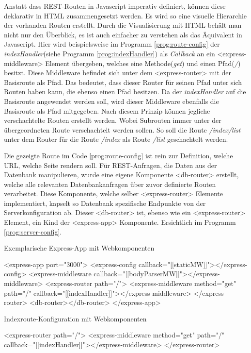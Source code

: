 Anstatt dass REST-Routen in Javascript imperativ definiert, können diese deklarativ in HTML zusammengesetzt werden. Es wird so eine visuelle Hierarchie der vorhanden Routen erstellt. Durch die Visualisierung mit HTML behält man nicht nur den Überblick, es ist auch einfacher zu verstehen als das Äquivalent in Javascript. Hier wird beispielsweise im Programm \ref{prog:route-config} der \textit{indexHandler}(siehe Programm \ref{prog:indexHandler}) als \textit{Callback} an ein <express-middleware> Element übergeben, welches eine Methode(\textit{get}) und einen Pfad(\textit{/})  besitzt. Diese Middleware befindet sich unter dem <express-router> mit der Basisroute als Pfad. Das bedeutet, dass dieser Router für seinen Pfad unter sich Routen haben kann, die ebenso einen Pfad besitzen. Da der \textit{indexHandler} auf die Basisroute angewendet werden soll, wird dieser Middleware ebenfalls die Basisroute als Pfad mitgegeben. Nach diesem Prinzip können jegliche verschachtelte Routen erstellt werden. Wobei Subrouten immer unter der übergeordneten Route verschachtelt werden sollen. So soll die Route \textit{/index/list} unter dem Router für die Route \textit{/index} als Route \textit{/list} geschachtelt werden.

Die gezeigte Route im Code  \ref{prog:route-config} ist rein zur Definition, welche URL, welche Seite rendern soll. Für REST-Anfragen, die Daten aus der Datenbank manipulieren, wurde eine eigene Komponente <db-router> erstellt, welche alle relevanten Datenbankanfragen über zuvor definierte Routen verarbeitet. Diese Komponente, welche selber <express-router> Elemente implementiert, kapselt so Datenbank spezifische Endpunkte von der Serverkonfiguration ab. Dieser <db-router> ist, ebenso wie ein <express-router> Element, ein Kind der <express-app> Komponente. Ersichtlich im Programm \ref{prog:server-config}.

\begin{program}
\caption{Exemplarische Express-App mit Webkomponenten}
\label{prog:server-config}
\begin{HtmlCode}
<express-app port="3000">
	<express-config callback="[[staticMW]]"></express-config>
	<express-middleware callback="[[bodyParserMW]]"></express-middleware>
	<express-router path="/">
	<express-middleware method="get" path="/" callback="[[indexHandler]]"></express-middleware>
	</express-router>
	<db-router></db-router>
</express-app>
\end{HtmlCode}
\end{program}

\begin{program}
\caption{Indexroute-Konfiguration mit Webkomponenten}
\label{prog:route-config}
\begin{HtmlCode}
<express-router path="/">
	<express-middleware method="get" path="/" callback="[[indexHandler]]"></express-middleware>
</express-router>
\end{HtmlCode}
\end{program}

